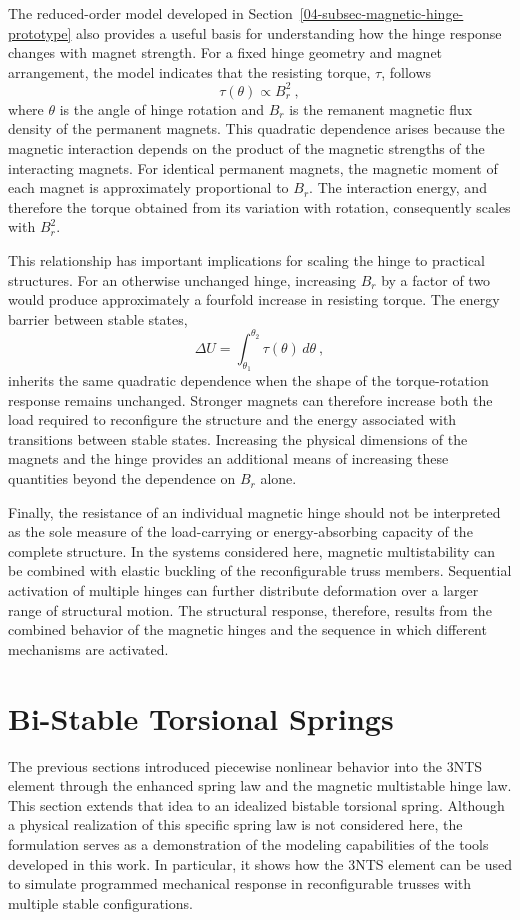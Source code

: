 The reduced-order model developed in Section~\ref{04-subsec-magnetic-hinge-prototype} also provides a useful basis for understanding how the hinge response changes with magnet strength. For a fixed hinge geometry and magnet arrangement, the model indicates that the resisting torque, \(\tau\), follows
\begin{equation}
\tau(\theta) \propto B_r^2~,
\end{equation}
where \(\theta\) is the angle of hinge rotation and \(B_r\) is the remanent magnetic flux density of the permanent magnets. This quadratic dependence arises because the magnetic interaction depends on the product of the magnetic strengths of the interacting magnets. For identical permanent magnets, the magnetic moment of each magnet is approximately proportional to \(B_r\). The interaction energy, and therefore the torque obtained from its variation with rotation, consequently scales with \(B_r^2\).

This relationship has important implications for scaling the hinge to practical structures. For an otherwise unchanged hinge, increasing \(B_r\) by a factor of two would produce approximately a fourfold increase in resisting torque. The energy barrier between stable states,
\begin{equation}
\Delta U = \int_{\theta_1}^{\theta_2} \tau(\theta)\,d\theta~,
\end{equation}
inherits the same quadratic dependence when the shape of the torque-rotation response remains unchanged. Stronger magnets can therefore increase both the load required to reconfigure the structure and the energy associated with transitions between stable states. Increasing the physical dimensions of the magnets and the hinge provides an additional means of increasing these quantities beyond the dependence on \(B_r\) alone.

Finally, the resistance of an individual magnetic hinge should not be interpreted as the sole measure of the load-carrying or energy-absorbing capacity of the complete structure. In the systems considered here, magnetic multistability can be combined with elastic buckling of the reconfigurable truss members. Sequential activation of multiple hinges can further distribute deformation over a larger range of structural motion. The structural response, therefore, results from the combined behavior of the magnetic hinges and the sequence in which different mechanisms are activated.

\section{Bi-Stable Torsional Springs}\label{04-sec-bistable-spring}
The previous sections introduced piecewise nonlinear behavior into the 3NTS element through the enhanced spring law and the magnetic multistable hinge law. This section extends that idea to an idealized bistable torsional spring. Although a physical realization of this specific spring law is not considered here, the formulation serves as a demonstration of the modeling capabilities of the tools developed in this work. In particular, it shows how the 3NTS element can be used to simulate programmed mechanical response in reconfigurable trusses with multiple stable configurations.

